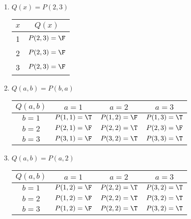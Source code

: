\begin{solutions}
\begin{enumerate}
			\item $Q(x) = P(2,3)$
			
									\begin{table}[h!]
				\begin{center}
					\begin{tabular}{c|c}
						
						$x$ & $Q(x)$ \\
						\hline
						1 & $P(2,3) = \F$ \\ 
						2 & $P(2,3) = \F$ \\
						3 & $P(2,3) = \F$ \\
					\end{tabular}
				\end{center}
			\end{table}
		
			\item $Q(a,b) = P(b,a)$
			
					\begin{table}[h!]
				\begin{center}
					\begin{tabular}{c|c|c|c|}
						$ Q(a,b)$        &$a=1$ & $a=2$ & $a=3$  \\
						\hline
						$b=1$ &    $P(1,1) = \T$      &     $P(1,2) = \F$      & $P(1,3) = \T$        \\
						\hline
						$b=2$ &    $P(2,1) = \F$      &     $P(2,2) = \T$      & $P(2,3) = \F$        \\
						\hline
						$b=3$ &    $P(3,1) = \F$      &     $P(3,2) = \T$      & $P(3,3) = \T$        \\
						\hline
					\end{tabular}
				\end{center}
			\end{table}
			
			
			\item $Q(a,b) = P(a,2)$
			
								\begin{table}[h!]
				\begin{center}
					\begin{tabular}{c|c|c|c|}
						$ Q(a,b)$        &$a=1$ & $a=2$ & $a=3$  \\
						\hline
						$b=1$ &    $P(1,2) = \F$      &     $P(2,2) = \T$      & $P(3,2) = \T$        \\
						\hline
						$b=2$ &    $P(1,2) = \F$      &     $P(2,2) = \T$      & $P(3,2) = \T$        \\
						\hline
						$b=3$ &    $P(1,2) = \F$      &     $P(2,2) = \T$      & $P(3,2) = \T$        \\
						\hline
					\end{tabular}
				\end{center}
			\end{table}
			
			
		\end{enumerate}
	\end{solutions}

